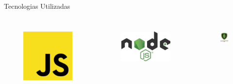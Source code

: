 \documentclass{beamer} %
\begin{document}
\begin{frame}{Tecnologias Utilizadas}
\begin{columns}
    
    \begin{figure}
        \centering
        \includegraphics[width=0.5\linewidth]{imagens/js.jpg}
        \label{fig:js}
    \end{figure}
    
    \begin{figure}
        \centering
        \includegraphics[width=0.5\linewidth]{imagens/nodejs.jpg}
        \label{fig:nodejs}
    \end{figure}
    
    
    \begin{figure}
        \centering
        \includegraphics[width=0.5\linewidth]{imagens/mongodb-logo.png}
        \label{fig:mongodb}
    \end{figure}
    

\end{columns}
\end{frame}
\end{document}

